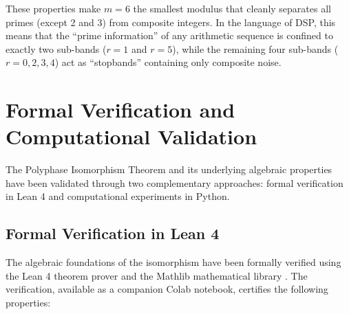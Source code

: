 \documentclass{mcom-l} %
\theoremstyle{plain} %
\theoremstyle{definition} %
\theoremstyle{remark} %
\begin{document}
These properties make \(m=6\) the smallest modulus that cleanly separates all primes (except 2 and 3) from composite integers. In the language of DSP, this means that the ``prime information'' of any arithmetic sequence is confined to exactly two sub-bands (\(r=1\) and \(r=5\)), while the remaining four sub-bands (\(r=0,2,3,4\)) act as ``stopbands'' containing only composite noise.

\section{Formal Verification and Computational Validation}
\label{sec:verification}

The Polyphase Isomorphism Theorem and its underlying algebraic properties have been validated through two complementary approaches: formal verification in Lean 4 and computational experiments in Python.

\subsection{Formal Verification in Lean 4}
\label{sec:lean}

The algebraic foundations of the isomorphism have been formally verified using the Lean 4 theorem prover and the Mathlib mathematical library \cite{mathlib}. The verification, available as a companion Colab notebook, certifies the following properties:
\end{document}
